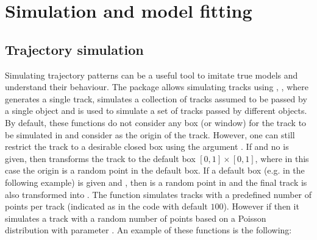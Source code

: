 \documentclass[article]{jss}
\begin{document}
\section{Simulation and model fitting}\label{simandfitt}
  \subsection{Trajectory simulation}
  Simulating trajectory patterns can be a useful tool to imitate true models and understand their behaviour. The package  allows simulating tracks using , ,  where  generates a single track,  simulates a collection of tracks assumed to be passed by a single object and  is used to simulate a set of tracks passed by different objects. By default, these functions do not consider any box (or window) for the track to be simulated in and consider  as the origin of the track. However, one can still restrict the track to a desirable closed box using the argument . If  and no  is given, then  transforms the track to the default box $[0,1]\times [0,1]$, where in this case the origin is a random point in the default box. If a default box  (e.g.  in the following example) is given and , then  is a random point in  and the final track is also transformed into . The function  simulates tracks with a predefined number of points per track (indicated as  in the code with default $100$). However if  then it simulates a track with a random number of points based on a Poisson distribution with parameter . An example of these functions is the following:
\end{document}
